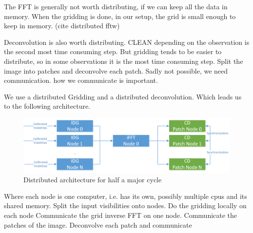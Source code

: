 The FFT is generally not worth distributing, if we can keep all the data in memory. When the gridding is done, in our setup, the grid is small enough to keep in memory. (cite distributed fftw)

Deconvolution is also worth distributing. CLEAN depending on the observation is the second most time consuming step. But gridding tends to be easier to distribute, so in some observations it is the most time consuming step.
Split the image into patches and deconvolve each patch.
Sadly not possible, we need communication. how we communicate is important.

We use a distributed Gridding and a distributed deconvolution. Which leads us to the following architecture.

\begin{figure}[h]
	\centering
	\includegraphics[width=0.80\linewidth]{./chapters/03.distribution/distributed_architecture.png}
	\caption{Distributed architecture for half a major cycle}
	\label{dist:architecture:fig}
\end{figure}

Where each node is one computer, i.e. has its own, possibly multiple cpus and its shared memory.
Split the input visibilities onto nodes. 
Do the gridding locally on each node
Communicate the grid
inverse FFT on one node.
Communicate the patches of the image.
Deconvolve each patch and communicate
